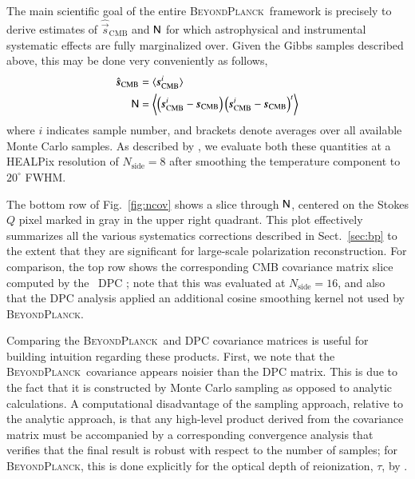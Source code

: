 \documentclass[twocolumn]{aa}
\newcommand{\s}[0]{\vec{s}}
\newcommand{\N}[0]{\tens{N}}
\newcommand{\BP}{\textsc{BeyondPlanck}}
\begin{document}
The main scientific goal of the entire \BP\ framework is precisely to
derive estimates of $\hat{\s}_{\mathrm{CMB}}$ and $\N$ for which
astrophysical and instrumental systematic effects are fully
marginalized over. Given the Gibbs samples described above, this may
be done very conveniently as follows,
\begin{align}
  \hat{\s}_{\mathrm{CMB}} &= \langle\s^i_{\mathrm{CMB}}\rangle \\
  \N &= \left\langle\left( \s^i_{\mathrm{CMB}}-\s_{\mathrm{CMB}} \right)
  \left( \s^i_{\mathrm{CMB}}-\s_{\mathrm{CMB}} \right)^t\right\rangle
  \label{eq:postmean}
\end{align}
where $i$ indicates sample number, and brackets denote averages over
all available Monte Carlo samples. As described by \citet{bp12}, we
evaluate both these quantities at a HEALPix resolution of
$N_{\mathrm{side}}=8$ after smoothing the temperature component to
$20^{\circ}$ FWHM.

The bottom row of Fig.~\ref{fig:ncov} shows a slice through $\N$,
centered on the Stokes $Q$ pixel marked in gray in the upper right
quadrant. This plot effectively summarizes all the various systematics
corrections described in Sect.~\ref{sec:bp} to the extent that they
are significant for large-scale polarization reconstruction. For
comparison, the top row shows the corresponding CMB covariance matrix
slice computed by the \Planck\ DPC \citet{planck2016-l02}; note that
this was evaluated at $N_{\mathrm{side}}=16$, and also that the DPC
analysis applied an additional cosine smoothing kernel not used by
\BP.

Comparing the \BP\ and DPC covariance matrices is useful for building
intuition regarding these products. First, we note that the
\BP\ covariance appears noisier than the DPC matrix. This is due to
the fact that it is constructed by Monte Carlo sampling as opposed to
analytic calculations. A computational disadvantage of the sampling
approach, relative to the analytic approach, is that any high-level
product derived from the covariance matrix must be accompanied by a
corresponding convergence analysis that verifies that the final result
is robust with respect to the number of samples; for \BP, this is done
explicitly for the optical depth of reionization, $\tau$, by
\citet{bp12}.
\end{document}

